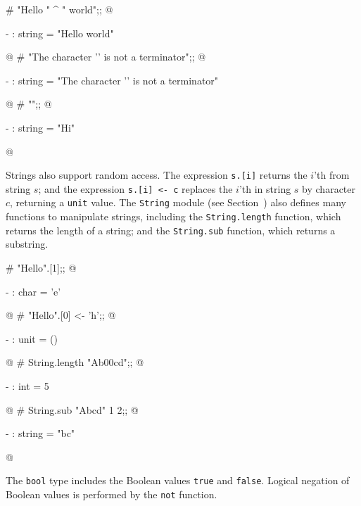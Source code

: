 \begin{ocaml}
# "Hello " ^ " world\n";;
@
\begin{topoutput}
- : string = "Hello world\n"
\end{topoutput}
@
# "The character '' is not a terminator";;
@
\begin{topoutput}
- : string = "The character '' is not a terminator"
\end{topoutput}
@
# "";;
@
\begin{topoutput}
- : string = "Hi"
\end{topoutput}
@
\end{ocaml}
%
Strings also support random access.  The
expression \index{.[@\lstinline/.[]/ string subscripting}\hbox{\lstinline/s.[i]/} returns the
$i$'th from string $s$; and the expression
\label{keyword:<-(string-assignment)}
\hbox{\lstinline/s.[i] <- c/}
replaces the $i$'th in string $s$ by character $c$, returning a
\hbox{\lstinline/unit/} value.  The
\hbox{\lstinline/String/} module (see
Section~) also defines many functions
to manipulate strings, including the
\hbox{\lstinline/String.length/}
function, which returns the length of a string; and the
\hbox{\lstinline/String.sub/}
function, which returns a substring.

\begin{ocaml}
# "Hello".[1];;
@
\begin{topoutput}
- : char = 'e'
\end{topoutput}
@
# "Hello".[0] <- 'h';;
@
\begin{topoutput}
- : unit = ()
\end{topoutput}
@
# String.length "Ab\000cd";;
@
\begin{topoutput}
- : int = 5
\end{topoutput}
@
# String.sub "Abcd" 1 2;;
@
\begin{topoutput}
- : string = "bc"
\end{topoutput}
@
\end{ocaml}

\label{keyword:true}
\label{keyword:false}

The \hbox{\lstinline/bool/} type includes the Boolean
values \hbox{\lstinline/true/}
and \hbox{\lstinline/false/}.  Logical
negation of Boolean values is performed by
the \hbox{\lstinline/not/}
function.


